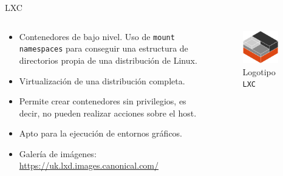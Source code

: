 \documentclass[aspectratio=169,xcolor=dvipsnames]{beamer}
\begin{document}
	\begin{frame}{LXC}
	    \begin{columns}
	        \begin{column}{0.6\textwidth}
	            \begin{itemize}
	                \item Contenedores de bajo nivel. Uso de \texttt{mount namespaces} para conseguir una estructura de directorios propia de una distribución de Linux.
	                \item Virtualización de una distribución completa.
	                \item Permite crear contenedores sin privilegios, es decir, no pueden realizar acciones sobre el host.
	                \item Apto para la ejecución de entornos gráficos.
	                \item Galería de imágenes: \url{https://uk.lxd.images.canonical.com/}
	            \end{itemize}
	        \end{column}
	        
	        \begin{column}{0.4\textwidth}
	            \begin{figure}[h]
                \includegraphics[width=0.8\textwidth]{img/lxc_logo.png}
                \caption{Logotipo \texttt{LXC}}
                \end{figure}
	        \end{column}
	    \end{columns}
	\end{frame}
	
\end{document}
